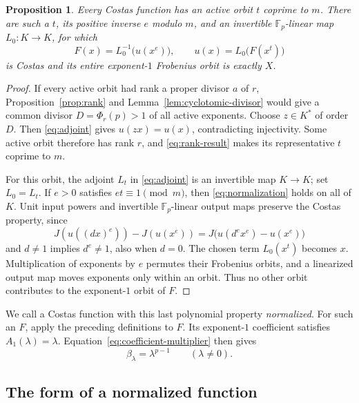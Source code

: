 \documentclass[11pt]{article}
\newtheorem{proposition}[theorem]{Proposition}
\theoremstyle{definition}
\theoremstyle{remark}
\newcommand{\Fp}{\mathbb F_p}
\numberwithin{equation}{section}
\begin{document}
\begin{proposition}\label{prop:normalization}
Every Costas function has an active orbit \(t\) coprime to \(m\).
There are such a \(t\), its positive inverse \(e\) modulo \(m\), and
an invertible \(\Fp\)-linear map \(L_0:K\to K\), for which
\begin{equation}\label{eq:normalization}
 F(x)=L_0^{-1}\bigl(u(x^e)\bigr),\qquad
 u(x)=L_0\bigl(F(x^t)\bigr)
\end{equation}
is Costas and its entire exponent-\(1\) Frobenius orbit is exactly \(X\).
\end{proposition}
\begin{proof}
If every active orbit had rank a proper divisor \(a\) of \(r\),
Proposition~\ref{prop:rank} and Lemma~\ref{lem:cyclotomic-divisor}
would give a common divisor \(D=\Phi_r(p)>1\) of all active
exponents. Choose \(z\in K^*\) of order \(D\).
Then \eqref{eq:adjoint} gives \(u(zx)=u(x)\), contradicting
injectivity. Some active orbit therefore has rank \(r\), and
\eqref{eq:rank-result} makes its representative \(t\) coprime to \(m\).

For this orbit, the adjoint \(L_t\) in \eqref{eq:adjoint} is an
invertible map \(K\to K\); set \(L_0=L_t\).
If \(e>0\) satisfies \(et\equiv1\pmod m\), then
\eqref{eq:normalization} holds on all of \(K\).
Unit input powers and invertible \(\Fp\)-linear output maps preserve
the Costas property, since
\[
 J(u((dx)^e))-J(u(x^e))
       =J\bigl(u(d^e x^e)-u(x^e)\bigr)
\]
and \(d\ne1\) implies \(d^e\ne1\), also when \(d=0\).
The chosen term \(L_0(x^t)\) becomes \(x\).
Multiplication of exponents by \(e\) permutes their Frobenius orbits,
and a linearized output map moves exponents only within an orbit.
Thus no other orbit contributes to the exponent-\(1\) orbit of \(F\).
\end{proof}

We call a Costas function with this last polynomial property
\emph{normalized}. For such an \(F\), apply the preceding definitions
to \(F\). Its exponent-\(1\) coefficient satisfies
\(A_1(\lambda)=\lambda\). Equation~\eqref{eq:coefficient-multiplier}
then gives
\begin{equation}\label{eq:normalized-beta}
 \beta_\lambda=\lambda^{p-1}\qquad(\lambda\ne0).
\end{equation}

\subsection{The form of a normalized function}
\end{document}
